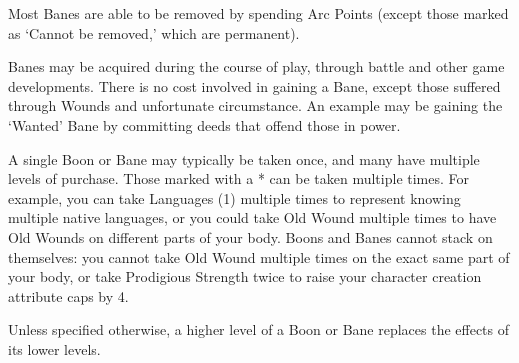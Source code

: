 \documentclass[oneside,11pt,english]{book}
\begin{document}
Most Banes are able to be removed by spending Arc Points (except those marked as ‘Cannot be 
removed,’ which are permanent). 


Banes may be acquired during the course of play, through battle and other game developments. There is 
no cost involved in gaining a Bane, except those suffered through Wounds and unfortunate circumstance. 
An example may be gaining the ‘Wanted’ Bane by committing deeds that offend those in power. 


A single Boon or Bane may typically be taken once, and many have multiple levels of purchase. Those 
marked with a * can be taken multiple times. For example, you can take Languages (1) multiple times to 
represent knowing multiple native languages, or you could take Old Wound multiple times to have Old 
Wounds on different parts of your body. Boons and Banes cannot stack on themselves: you cannot take 
Old Wound multiple times on the exact same part of your body, or take Prodigious Strength twice to raise 
your character creation attribute caps by 4. 


Unless specified otherwise, a higher level of a Boon or Bane replaces the effects of its lower levels. 
\end{document}
